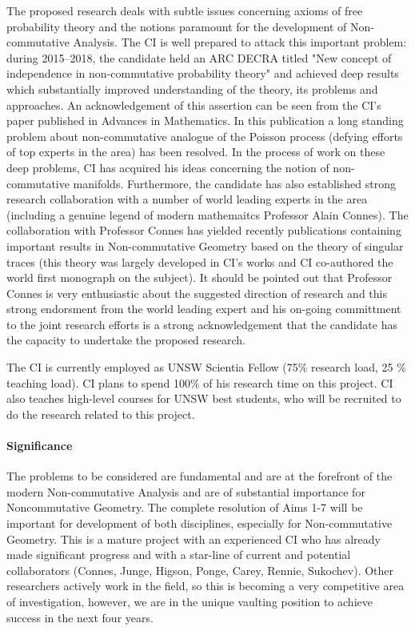 \documentclass{article}
\newcommand{\archeading}[1]{\vspace{.3cm} \noindent{\bfseries #1} \vspace{.1cm}   }
\begin{document}
The proposed research deals with subtle issues concerning axioms of free probability theory and the notions
paramount for the development of Non-commutative Analysis. The CI is well prepared to attack this important problem: during 2015--2018, the candidate held an ARC DECRA titled "New concept of independence in non-commutative probability theory" and achieved deep results which substantially improved understanding of the theory, its problems and approaches. An acknowledgement of this assertion can be seen from the CI's paper \cite{JSZ_advances} published in Advances in Mathematics. In this publication a long standing problem about non-commutative analogue of the Poisson process (defying efforts of top experts in the area) has been resolved. In the process of work on these deep problems, CI has acquired his ideas concerning the notion of non-commutative manifolds. Furthermore,
the candidate has also established strong research collaboration with a number of world leading experts in the area (including a genuine legend of modern mathemaitcs Professor Alain Connes). The collaboration with Professor Connes has yielded recently publications \cite{Connes_team} containing important results in Non-commutative Geometry based on the theory of singular traces (this theory was largely developed in CI's works and CI co-authored the world first monograph \cite{book} on the subject). It should be pointed out that Professor Connes is very enthusiastic about the suggested direction of research
and this strong endorsment from the world leading expert and his on-going committment to the joint research efforts is a strong acknowledgement that the candidate has the capacity to undertake the proposed research.

The CI is currently employed as UNSW Scientia Fellow (75\% research load, 25 \% teaching load). CI plans to spend 100\% of his research time on this project. CI also teaches high-level courses for UNSW best students, who will be recruited to do the research related to this project.

\bigskip\archeading{Project quality and innovation}

\paragraph*{Significance} The problems to be considered are fundamental and are at the forefront of the modern Non-commutative Analysis and are of substantial importance for Noncommutative Geometry. The complete resolution of Aims 1-7 will be important for development of both disciplines, especially for Non-commutative Geometry. This is a mature project with an experienced CI who has already made significant progress and with a star-line of current and potential collaborators (Connes, Junge, Higson, Ponge, Carey, Rennie, Sukochev). Other researchers actively work in the field, so this is becoming a very competitive area of investigation, however, we are in the unique vaulting position to achieve success in the next four years.
\end{document}
